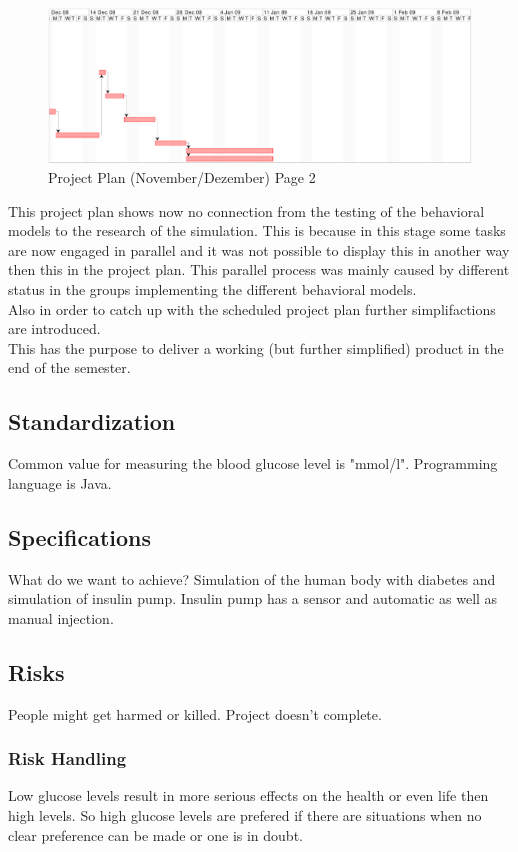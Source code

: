 \documentclass[pdflatex,a4paper,11pt,english]{scrreprt}
\begin{document}
\begin{figure}[htb]
\centering
\includegraphics[width=\textwidth]{images/projectplan_v3_page2}
\caption{Project Plan (November/Dezember) Page 2}
\label{fig:projectplan_v3_2}
\end{figure}

This project plan shows now no connection from the testing of the behavioral
models to the research of the simulation.
This is because in this stage some tasks are now engaged in parallel and it was
not possible to display this in another way then this in the project plan.
This parallel process was mainly caused by different status in the groups
implementing the different behavioral models. \\
Also in order to catch up with the scheduled project plan further
simplifactions are introduced. \\
This has the purpose to deliver a working (but further simplified) product in
the end of the semester.

\subsection{Standardization}
Common value for measuring the blood glucose level is "mmol/l".
Programming language is Java.

\subsection{Specifications}
What do we want to achieve?
Simulation of the human body with diabetes and simulation of insulin pump.
Insulin pump has a sensor and automatic as well as manual injection.

\subsection{Risks}
People might get harmed or killed.
Project doesn't complete.

\subsubsection{Risk Handling}
Low glucose levels result in more serious effects on the health or even life then high levels.
So high glucose levels are prefered if there are situations when no clear preference can be made or one is in doubt.
\end{document}

